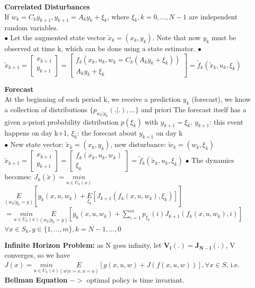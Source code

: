 \documentclass[10pt,landscape]{article}
\begin{document}
\begin{multicols*}{4}
\textbf{Correlated Disturbances}\\
If $w_k=C_k y_{k+1}, y_{k+1}=A_k y_k + \xi_k$, where $\xi_k, k=0,...,N-1$ are independent random variables.\\
$\bullet$ Let the augmented state vector $\tilde{x}_k = (x_k, y_k)$. Note that now $y_k$ must
be observed at time k, which can be done using a state estimator.
$\bullet$ 
$\tilde{x}_{k+1} = \begin{bmatrix}
	x_{k+1}\\
	y_{k+1}
\end{bmatrix} = \begin{bmatrix}
	f_k(x_k,u_k,w_k = C_k(A_k y_k +\xi_k))\\
	A_k y_k +\xi_k
\end{bmatrix} = \tilde{f}_k(\tilde{x}_k,u_k,\xi_k)$


\textbf{Forecast}\\
At the beginning of each period k, we receive a prediction $y_k$ (forecast), we know a collection of distributions $\{p_{w_k|y_k}(.|.),...\}$ and priori 
The forecast itself has a given a-priori probability distribution $p(\xi_k)$ with $y_{k+1} = \xi_k$. $y_{k+1}$: this event happens on day k+1, $\xi_k$: the forecast about $y_{k+1}$ on day k\\
$\bullet$ New state vector: $\tilde{x}_k = (x_k,y_k)$, new disturbance: $\tilde{w}_k = (w_k,\xi_k)$\\
$\tilde{x}_{k+1} = \begin{bmatrix}
	x_{k+1}\\
	y_{k+1}
\end{bmatrix} = \begin{bmatrix}
	f_k(x_k,u_k,w_k)\\
	\xi_k
\end{bmatrix} = \tilde{f}_k(\tilde{x}_k,u_k,\xi_k)$
$\bullet$ The dynamics becomes: $J_k(\tilde{x}) = \underset{u \in U_k(x)}{min}$
$ \underset{(w_k | y_k=y)}{E} [g_k(x,u,w_k) + \underset{\xi_k}{E} [J_{k+1} (f_k(x,u,w_k), \xi_k)]]$\\
$=\underset{u \in U_k(x)}{min} \underset{(w_k | y_k=y)}{E} [g_k(x,u,w_k) + \sum_{i=1}^{m} p_{\xi_k}(i) J_{k+1} (f_k(x,u,w_k), i)]$\\
$ \forall x \in S_k, y \in \{1,...,m\}, k = N-1,...,0$

\textbf{Infinite Horizon Problem:} as N goes infinity, let $\mathbf{V_l(.)=J_{N-l}(.)}$, V converges, so we have $J(x) = \underset{u \in U_k(x)}{min} \underset{(w | x=x,u=u)}{E} [g(x,u,w) + J(f(x,u,w))], \forall x \in S$, i.e. \textbf{Bellman Equation} $->$ optimal policy is time invariant.


\end{multicols*}
\end{document}

